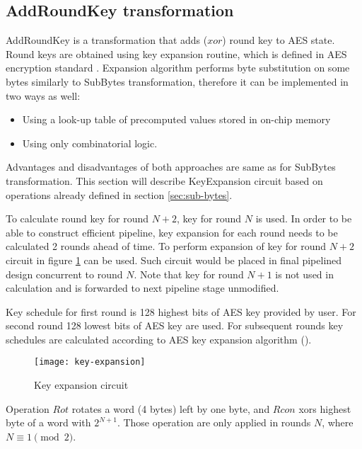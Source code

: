 \subsection{AddRoundKey transformation}

AddRoundKey is a transformation that adds ($xor$) round key to AES state. Round keys are obtained using key expansion routine, which is defined in AES encryption standard \cite{aes-standard}. Expansion algorithm performs byte substitution on some bytes similarly to SubBytes transformation, therefore it can be implemented in two ways as well:

\begin{itemize}[nolistsep]
\item Using a look-up table of precomputed values stored in on-chip memory
\item Using only combinatorial logic.
\end{itemize}

Advantages and disadvantages of both approaches are same as for SubBytes transformation. This section will describe KeyExpansion circuit based on operations already defined in section \ref{sec:sub-bytes}.

To calculate round key for round $N + 2$, key for round $N$ is used. In order to be able to construct efficient pipeline, key expansion for each round needs to be calculated 2 rounds ahead of time. To perform expansion of key for round $N + 2$ circuit in figure \ref{fig:key-expansion} can be used. Such circuit would be placed in final pipelined design concurrent to round $N$. Note that key for round $N + 1$ is not used in calculation and is forwarded to next pipeline stage unmodified.

Key schedule for first round is 128 highest bits of AES key provided by user. For second round 128 lowest bits of AES key are used. For subsequent rounds key schedules are calculated according to AES key expansion algorithm (\cite{aes-standard}).

\begin{figure}[!h]
\centering
\texttt{[image: key-expansion]}
\caption{Key expansion circuit}
\label{fig:key-expansion}
\end{figure}

Operation $Rot$ rotates a word (4 bytes) left by one byte, and $Rcon$ xors highest byte of a word with $2^{N + 1}$. Those operation are only applied in rounds $N$, where $N \equiv 1 \pmod{2}$.

